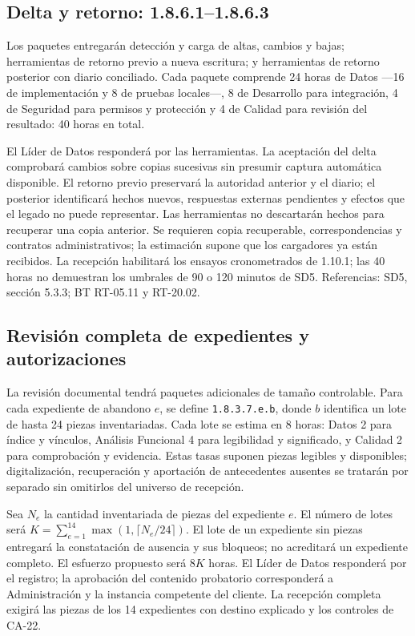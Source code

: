 \subsection{Delta y retorno: 1.8.6.1--1.8.6.3}
Los paquetes entregarán detección y carga de altas, cambios y bajas; herramientas de retorno previo a nueva escritura; y herramientas de retorno posterior con diario conciliado. Cada paquete comprende 24 horas de Datos ---16 de implementación y 8 de pruebas locales---, 8 de Desarrollo para integración, 4 de Seguridad para permisos y protección y 4 de Calidad para revisión del resultado: 40 horas en total.

El Líder de Datos responderá por las herramientas. La aceptación del delta comprobará cambios sobre copias sucesivas sin presumir captura automática disponible. El retorno previo preservará la autoridad anterior y el diario; el posterior identificará hechos nuevos, respuestas externas pendientes y efectos que el legado no puede representar. Las herramientas no descartarán hechos para recuperar una copia anterior. Se requieren copia recuperable, correspondencias y contratos administrativos; la estimación supone que los cargadores ya están recibidos. La recepción habilitará los ensayos cronometrados de 1.10.1; las 40 horas no demuestran los umbrales de 90 o 120 minutos de SD5. Referencias: SD5, sección 5.3.3; BT RT-05.11 y RT-20.02.

\subsection{Revisión completa de expedientes y autorizaciones}
La revisión documental tendrá paquetes adicionales de tamaño controlable. Para cada expediente de abandono $e$, se define \texttt{1.8.3.7.e.b}, donde $b$ identifica un lote de hasta 24 piezas inventariadas. Cada lote se estima en 8 horas: Datos 2 para índice y vínculos, Análisis Funcional 4 para legibilidad y significado, y Calidad 2 para comprobación y evidencia. Estas tasas suponen piezas legibles y disponibles; digitalización, recuperación y aportación de antecedentes ausentes se tratarán por separado sin omitirlos del universo de recepción.

Sea $N_e$ la cantidad inventariada de piezas del expediente $e$. El número de lotes será $K=\sum_{e=1}^{14}\max(1,\lceil N_e/24\rceil)$. El lote de un expediente sin piezas entregará la constatación de ausencia y sus bloqueos; no acreditará un expediente completo. El esfuerzo propuesto será $8K$ horas. El Líder de Datos responderá por el registro; la aprobación del contenido probatorio corresponderá a Administración y la instancia competente del cliente. La recepción completa exigirá las piezas de los 14 expedientes con destino explicado y los controles de CA-22.

